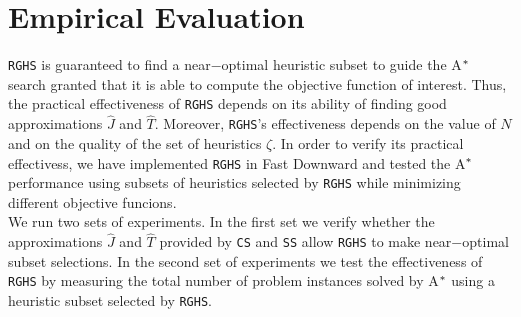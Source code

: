 



\chapter{Empirical Evaluation}\label{ch:empirical_evaluation}

\texttt{RGHS} is guaranteed to find a near$-$optimal heuristic subset to guide the A$\sp{*}$ search granted that it is able to compute the objective function of interest. Thus, the practical effectiveness of \texttt{RGHS} depends on its ability of finding good approximations $\hat{J}$ and $\hat{T}$. Moreover, \texttt{RGHS}'s effectiveness depends on the value of $N$ and on the quality of the set of heuristics $\zeta$. In order to verify its practical effectivess, we have implemented \texttt{RGHS} in Fast Downward \cite{helmert2006fast} and tested the A$\sp{*}$ performance using subsets of heuristics selected by \texttt{RGHS} while minimizing different objective funcions.\\

We run two sets of experiments. In the first set we verify whether the approximations $\hat{J}$ and $\hat{T}$ provided by \texttt{CS} and \texttt{SS} allow \texttt{RGHS} to make near$-$optimal subset selections. In the second set of experiments we test the effectiveness of \texttt{RGHS} by measuring the total number of problem instances solved by A$\sp{*}$ using a heuristic subset selected by \texttt{RGHS}.\\

